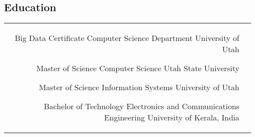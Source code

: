 \documentclass[10pt]{article} %
\begin{document}
\begin{paracol}{2}

\section{Education} 





\begin{supertabular}{rl} %
	
	{Big Data Certificate} %
	{} %
	{Computer Science Department} %
	{University of Utah} %
	
	{Master of Science} %
	{} %
	{Computer Science} %
	{Utah State University} %
	
	{Master of Science} %
	{} %
	{Information Systems} %
	{University of Utah} %

	
	{Bachelor of Technology} %
	{} %
	{Electronics and Communications Engineering} %
	{University of Kerala, India} %
	

	

	


\end{supertabular}
\end{paracol}
\end{document}
